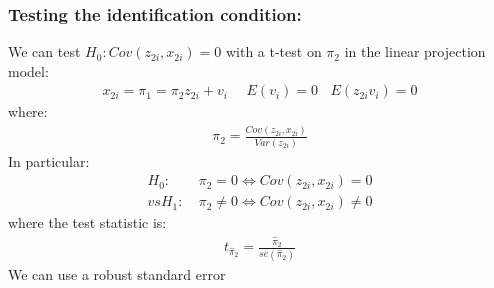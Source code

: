 \documentclass[a4paper,twoside,11pt]{article}
\begin{document}
\subsubsection{Testing the identification condition:}
We can test $H_0: Cov(z_{2i},x_{2i})=0$ with a t-test on $\pi_2$ in the linear projection model:
\begin{equation*}
\begin{aligned}
x_{2i} = \pi_1 = \pi_2 z_{2i} + v_i \ \ \ \ \ \ E(v_i) =0 \ \ \ \ E(z_{2i}v_i) =0
\end{aligned} 
\end{equation*}
where:
\begin{equation*}
\begin{aligned}
\pi_2 = \frac{Cov(z_{2i},x_{2i})}{Var(z_{2i})}
\end{aligned} 
\end{equation*}
In particular:
\begin{equation*}
\begin{aligned}
H_0 :& \  \pi_2 = 0 \Leftrightarrow Cov(z_{2i}, x_{2i})= 0 \\
vs H_1:& \ \pi_2 \ne 0 \Leftrightarrow Cov(z_{2i}, x_{2i} ) \ne 0
\end{aligned} 
\end{equation*}
where the test statistic is:
\begin{equation*}
\begin{aligned}
t_{\hat{\pi}_2} = \frac{\hat{\pi}_2}{se(\hat{\pi}_2)}
\end{aligned} 
\end{equation*}
We can use a robust standard error
\end{document}
